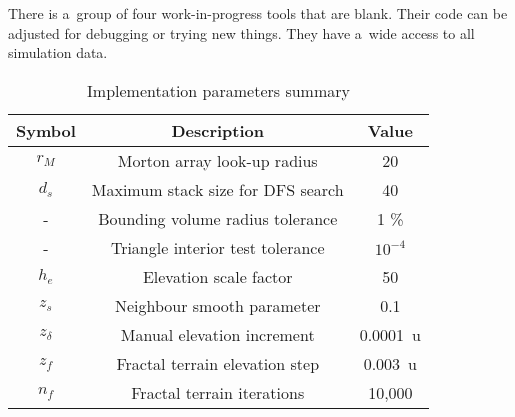 There is a~group of four work-in-progress tools that are blank. Their code can be adjusted for debugging or trying new things. They have a~wide access to all simulation data.
\begin{table}[h]
\centering
\begin{tabular}{ccc}
\textbf{Symbol}&\textbf{Description}&\textbf{Value}\\
\hline
$r_M$&Morton array look-up radius&20\\
$d_s$&Maximum stack size for DFS search&40\\
-&Bounding volume radius tolerance&1 \%\\
-&Triangle interior test tolerance&$10^{-4}$\\
$h_e$&Elevation scale factor&50\\
$z_s$&Neighbour smooth parameter&0.1\\
$z_\delta$&Manual elevation increment&0.0001\mbox{ u}\\
$z_f$&Fractal terrain elevation step&0.003\mbox{ u}\\
$n_f$&Fractal terrain iterations&10,000\\
\end{tabular}
\caption{Implementation parameters summary}
\label{tab:implementation-parameters-summary}
\end{table}